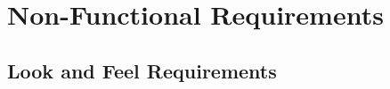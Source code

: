 \documentclass[]{article}
\begin{document}
\begin{enumerate}[{BE}1.]

\end{enumerate}


\section{Non-Functional Requirements}
\label{sec:non-functional_requirements}
\subsection{Look and Feel Requirements}
\label{sub:look_and_feel_requirements}
\end{document}
